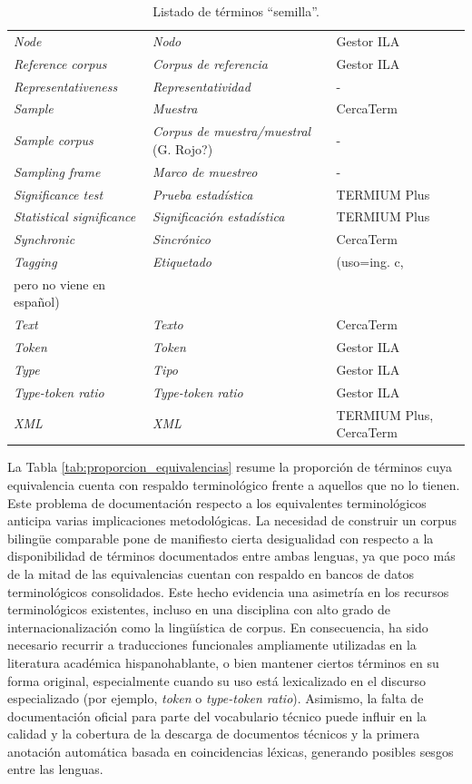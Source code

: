 \begin{table}[H]
\begin{tabular}{lll}
\textit{Node} & \textit{Nodo} & Gestor ILA \\
\textit{Reference corpus} & \textit{Corpus de referencia} & Gestor ILA \\
\textit{Representativeness} & \textit{Representatividad} & -\\
\textit{Sample} & \textit{Muestra} & CercaTerm \\
\textit{Sample corpus} & \textit{Corpus de muestra/muestral} (G. Rojo?) & - \\
\textit{Sampling frame} & \textit{Marco de muestreo} & -\\
\textit{Significance test} & \textit{Prueba estadística} & TERMIUM Plus \\
\textit{Statistical significance} & \textit{Significación estadística} & TERMIUM Plus\\
\textit{Synchronic} & \textit{Sincrónico} & CercaTerm \\
\textit{Tagging} & \textit{Etiquetado} & (uso=ing. c,\\pero no viene en español) \\
\textit{Text} & \textit{Texto} & CercaTerm \\
\textit{Token} & \textit{Token} & Gestor ILA \\
\textit{Type} & \textit{Tipo} & Gestor ILA \\
\textit{Type-token ratio} & \textit{Type-token ratio} & Gestor ILA\\
\textit{XML} & \textit{XML} & TERMIUM Plus, CercaTerm \\
\bottomrule
\end{tabular}
\caption{Listado de términos ``semilla''.}
\label{tab:glosario_cass}
\end{table}

La Tabla \ref{tab:proporcion_equivalencias} resume la proporción de términos cuya equivalencia cuenta con respaldo terminológico frente a aquellos que no lo tienen. Este problema de documentación respecto a los equivalentes terminológicos anticipa varias implicaciones metodológicas. La necesidad de construir un corpus bilingüe comparable pone de manifiesto cierta desigualidad con respecto a la disponibilidad de términos documentados entre ambas lenguas, ya que poco más de la mitad de las equivalencias cuentan con respaldo en bancos de datos terminológicos consolidados. Este hecho evidencia una asimetría en los recursos terminológicos existentes, incluso en una disciplina con alto grado de internacionalización como la lingüística de corpus. En consecuencia, ha sido necesario recurrir a traducciones funcionales ampliamente utilizadas en la literatura académica hispanohablante, o bien mantener ciertos términos en su forma original, especialmente cuando su uso está lexicalizado en el discurso especializado (por ejemplo, \textit{token} o\textit{ type-token ratio}). Asimismo, la falta de documentación oficial para parte del vocabulario técnico puede influir en la calidad y la cobertura de la descarga de documentos técnicos y la primera anotación automática basada en coincidencias léxicas, generando posibles sesgos entre las lenguas.

